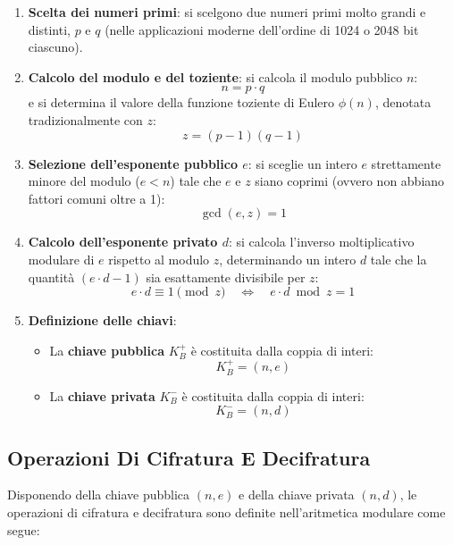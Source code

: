\documentclass[11pt, a4paper]{article}
\begin{document}
\begin{enumerate}[leftmargin=*]
    \item \textbf{Scelta dei numeri primi}: si scelgono due numeri primi molto grandi e distinti, $p$ e $q$ (nelle applicazioni moderne dell'ordine di 1024 o 2048 bit ciascuno).

    \item \textbf{Calcolo del modulo e del toziente}:
    si calcola il modulo pubblico $n$:
    \[
    n = p \cdot q
    \]
    e si determina il valore della funzione toziente di Eulero $\phi(n)$, denotata tradizionalmente con $z$:
    \[
    z = (p - 1)(q - 1)
    \]

    \item \textbf{Selezione dell'esponente pubblico $e$}:
    si sceglie un intero $e$ strettamente minore del modulo ($e < n$) tale che $e$ e $z$ siano coprimi (ovvero non abbiano fattori comuni oltre a 1):
    \[
    \gcd(e, z) = 1
    \]

    \item \textbf{Calcolo dell'esponente privato $d$}:
    si calcola l'inverso moltiplicativo modulare di $e$ rispetto al modulo $z$, determinando un intero $d$ tale che la quantità $(e \cdot d - 1)$ sia esattamente divisibile per $z$:
    \begin{equation}
    e \cdot d \equiv 1 \pmod z \quad \iff \quad e \cdot d \bmod z = 1
    \end{equation}

    \item \textbf{Definizione delle chiavi}:
    \begin{itemize}[noitemsep]
        \item La \textbf{chiave pubblica} $K_B^+$ è costituita dalla coppia di interi:
        \[
        \boxed{K_B^+ = (n, e)}
        \]
        \item La \textbf{chiave privata} $K_B^-$ è costituita dalla coppia di interi:
        \[
        \boxed{K_B^- = (n, d)}
        \]
    \end{itemize}
\end{enumerate}

\subsection{Operazioni Di Cifratura E Decifratura}

Disponendo della chiave pubblica $(n, e)$ e della chiave privata $(n, d)$, le operazioni di cifratura e decifratura sono definite nell'aritmetica modulare come segue:
\end{document}
